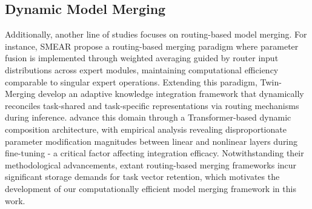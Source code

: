 \subsection{Dynamic Model Merging}

Additionally, another line of studies focuses on routing-based model merging.
For instance, SMEAR \citep{smear} propose a routing-based merging paradigm where parameter fusion is implemented through weighted averaging guided by router input distributions across expert modules, maintaining computational efficiency comparable to singular expert operations.
Extending this paradigm, Twin-Merging \citep{twin-merging} develop an adaptive knowledge integration framework that dynamically reconciles task-shared and task-specific representations via routing mechanisms during inference.
\citep{weight-ensemble} advance this domain through a Transformer-based dynamic composition architecture, with empirical analysis revealing disproportionate parameter modification magnitudes between linear and nonlinear layers during fine-tuning - a critical factor affecting integration efficacy. Notwithstanding their methodological advancements, extant routing-based merging frameworks incur significant storage demands for task vector retention, which motivates the development of our computationally efficient model merging framework in this work.
